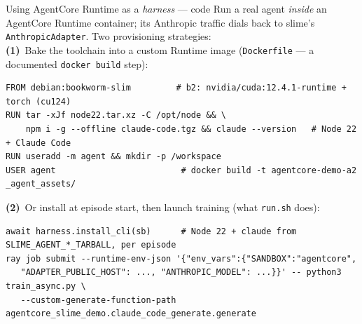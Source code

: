 \documentclass[aspectratio=169]{beamer}
\begin{document}
\begin{frame}[fragile]{Using AgentCore Runtime as a \emph{harness} --- code}
  \footnotesize Run a real agent \emph{inside} an AgentCore Runtime container; its Anthropic traffic
  dials back to slime's \texttt{AnthropicAdapter}. Two provisioning strategies:
  \vspace{0.1em}\\ \textbf{(1)}~Bake the toolchain into a custom Runtime image (\texttt{Dockerfile} --- a documented \texttt{docker build} step):
\begin{lstlisting}[basicstyle=\ttfamily\scriptsize]
FROM debian:bookworm-slim         # b2: nvidia/cuda:12.4.1-runtime + torch (cu124)
RUN tar -xJf node22.tar.xz -C /opt/node && \
    npm i -g --offline claude-code.tgz && claude --version   # Node 22 + Claude Code
RUN useradd -m agent && mkdir -p /workspace
USER agent                         # docker build -t agentcore-demo-a2 _agent_assets/
\end{lstlisting}
  \vspace{-0.2em}\textbf{(2)}~Or install at episode start, then launch training (what \texttt{run.sh} does):
\begin{lstlisting}[basicstyle=\ttfamily\scriptsize]
await harness.install_cli(sb)      # Node 22 + claude from SLIME_AGENT_*_TARBALL, per episode
ray job submit --runtime-env-json '{"env_vars":{"SANDBOX":"agentcore",
   "ADAPTER_PUBLIC_HOST": ..., "ANTHROPIC_MODEL": ...}}' -- python3 train_async.py \
   --custom-generate-function-path agentcore_slime_demo.claude_code_generate.generate
\end{lstlisting}
\end{frame}
\end{document}
